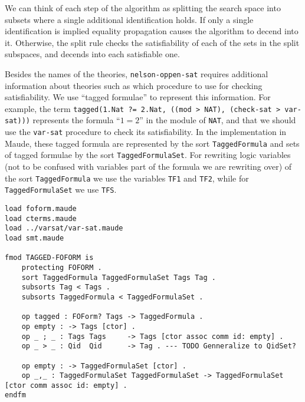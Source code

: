 \documentclass[]{article}
\begin{document}
We can think of each step of the algorithm as splitting the search space
into subsets where a single additional identification holds. If only a
single identification is implied equality propagation causes the
algorithm to decend into it. Otherwise, the split rule checks the
satisfiability of each of the sets in the split subspaces, and decends
into each satisfiable one.

Besides the names of the theories, \texttt{nelson-oppen-sat} requires
additional information about theories such as which procedure to use for
checking satisfiability. We use ``tagged formulae'' to represent this
information. For example, the term
\texttt{tagged(\textquotesingle{}1.Nat\ ?=\ \textquotesingle{}2.Nat,\ ((\textquotesingle{}mod\ \textgreater{}\ \textquotesingle{}NAT),\ (\textquotesingle{}check-sat\ \textgreater{}\ \textquotesingle{}var-sat)))}
represents the formula ``\(1 = 2\)'' in the module of \texttt{NAT}, and
that we should use the \texttt{var-sat} procedure to check its
satisfiability. In the implementation in Maude, these tagged formula are
represented by the sort \texttt{TaggedFormula} and sets of tagged
formulae by the sort \texttt{TaggedFormulaSet}. For rewriting logic
variables (not to be confused with variables part of the formula we are
rewriting over) of the sort \texttt{TaggedFormula} we use the variables
\texttt{TF1} and \texttt{TF2}, while for \texttt{TaggedFormulaSet} we
use \texttt{TFS}.

\begin{verbatim}
load foform.maude
load cterms.maude
load ../varsat/var-sat.maude
load smt.maude

fmod TAGGED-FOFORM is
    protecting FOFORM .
    sort TaggedFormula TaggedFormulaSet Tags Tag .
    subsorts Tag < Tags .
    subsorts TaggedFormula < TaggedFormulaSet .

    op tagged : FOForm? Tags -> TaggedFormula .
    op empty : -> Tags [ctor] .
    op _ ; _ : Tags Tags     -> Tags [ctor assoc comm id: empty] .
    op _ > _ : Qid  Qid      -> Tag . --- TODO Genneralize to QidSet?

    op empty : -> TaggedFormulaSet [ctor] .
    op _,_ : TaggedFormulaSet TaggedFormulaSet -> TaggedFormulaSet [ctor comm assoc id: empty] .
endfm
\end{verbatim}
\end{document}
